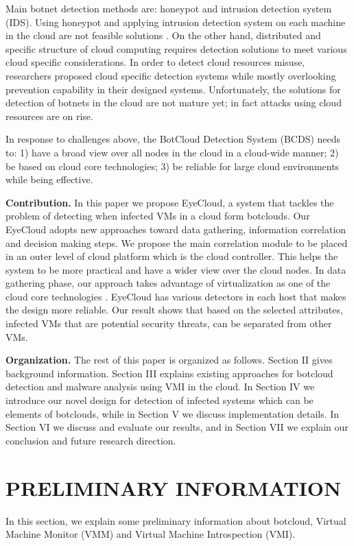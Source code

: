 \documentclass[conference]{IEEEtran}
\begin{document}
Main botnet detection methods are: honeypot and intrusion detection system (IDS). Using honeypot and applying intrusion detection system on each machine in the cloud are not feasible solutions \cite{ref42} \cite{ref38}. On the other hand, distributed and specific structure of cloud computing requires detection solutions to meet various cloud specific considerations. In order to detect cloud resources misuse, researchers proposed cloud specific detection systems while mostly overlooking prevention capability in their designed systems. Unfortunately, the solutions for detection of botnets in the cloud are not mature yet; in fact attacks using cloud resources are on rise.

In response to challenges above, the BotCloud Detection System (BCDS) needs to: 1) have a broad view over all nodes in the cloud in a cloud-wide manner; 2) be based on cloud core technologies; 3) be reliable for large cloud environments while being effective. 

\textbf{Contribution.}
In this paper we propose EyeCloud, a system that tackles the problem of detecting when infected VMs in a cloud form botclouds. Our EyeCloud adopts new approaches toward data gathering, information correlation and decision making steps. We propose the main correlation module to be placed in an outer level of cloud platform which is the cloud controller. This helps the system to be more practical and have a wider view over the cloud nodes. In data gathering phase, our approach takes advantage of virtualization as one of the cloud core technologies \cite{ref9}. EyeCloud has various detectors in each host that makes the design more reliable. Our result shows that based on the selected attributes, infected VMs that are potential security threats, can be separated from other VMs. 

\textbf{Organization.}
The rest of this paper is organized as follows. Section II gives background information. Section III explains existing approaches for botcloud detection and malware analysis using VMI in the cloud. In Section IV we introduce our novel design for detection of infected systems which can be elements of botclouds, while in Section V we discuss implementation details. In Section VI we discuss and evaluate our results, and in Section VII we explain our conclusion and future research direction.
\section{PRELIMINARY INFORMATION }
In this section, we explain some preliminary information about botcloud, Virtual Machine Monitor (VMM) and Virtual Machine Introspection (VMI).
 
\end{document}
